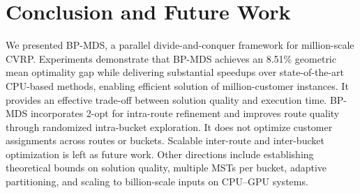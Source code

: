 \section{Conclusion and Future Work}

We presented BP-MDS, a parallel divide-and-conquer framework for million-scale CVRP. Experiments demonstrate that BP-MDS achieves an 8.51\% geometric mean optimality gap while delivering substantial speedups over state-of-the-art CPU-based methods, enabling efficient solution of million-customer instances. It provides an effective trade-off between solution quality and execution time. BP-MDS incorporates 2-opt for intra-route refinement and improves route quality through randomized intra-bucket exploration. It does not optimize customer assignments across routes or buckets. Scalable inter-route and inter-bucket optimization is left as future work. Other directions include establishing theoretical bounds on solution quality, multiple MSTs per bucket, adaptive partitioning, and scaling to billion-scale inputs on CPU--GPU systems.

